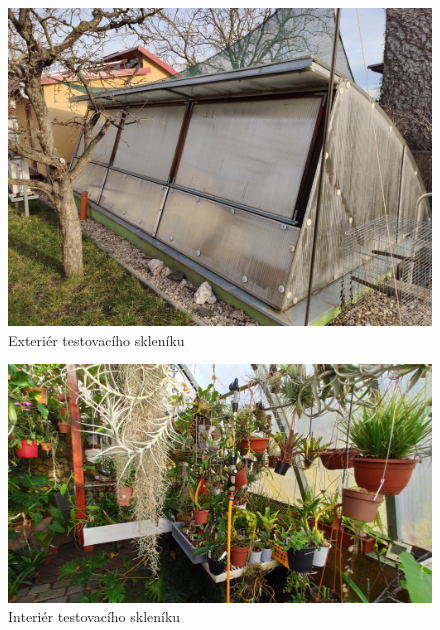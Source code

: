 
\begin{figure}[htbp]
    \centering
    \includegraphics[width=\textwidth]{img/PHOTOS/OrchidHouse_EXTERIOR.jpg}
    \caption{Exteriér testovacího skleníku}
    \label{fig:OrchidHouse_EXTERIOR}
\end{figure}

\begin{figure}[htbp]
    \centering
    \includegraphics[width=\textwidth]{img/PHOTOS/OrchidHouse_INTERIOR.jpg}
    \caption{Interiér testovacího skleníku}
    \label{fig:OrchidHouse_INTERIORs}
\end{figure}
\newpage